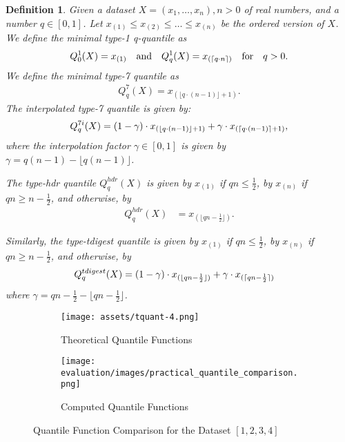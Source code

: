 \documentclass{article}
\DeclarePairedDelimiter{\ceil}{\lceil}{\rceil}
\theoremstyle{plain}
\newtheorem{definition}{Definition}[section]
\theoremstyle{remark}
\newcommand{\qtext}[1]{\quad\text{#1}\quad} %
\newcommand{\floor}[1]{\lfloor#1\rfloor}
\begin{document}
\begin{definition} \label{def:quantiles}
  Given a dataset $X=(x_1,\dots,x_n), n>0$ of real numbers, and a number $q \in [0,1]$.
  Let $x_{(1)} \leq x_{(2)} \leq \dots \leq x_{(n)}$ be the ordered version of $X$.
  We define the minimal type-1 q-quantile as
  \begin{align*}
    Q^1_0(X) = x_{(1)} \qtext{and}  Q^1_q(X) = x_{(\ceil{q \cdot n})} \qtext{for} q > 0.
  \end{align*}
  We define the minimal type-7 quantile as
  \begin{align*}
    Q^{7}_q(X) = x_{(\floor{q \cdot (n - 1)} + 1)}.
  \end{align*}
  The interpolated type-7 quantile is given by:
  \begin{align*}
    Q^{7i}_q(X) = (1 - \gamma) \cdot x_{(\floor{q \cdot (n - 1)} + 1)} + \gamma \cdot x_{(\ceil{q \cdot (n - 1)} + 1)},
  \end{align*}
  where the interpolation factor $\gamma \in [0,1]$ is given by $\gamma = q(n-1) - \floor{q(n-1)}$.

  The type-hdr quantile $Q^{hdr}_q(X)$ is given by $x_{(1)}$ if $qn \leq \frac{1}{2}$, by $x_{(n)}$
  if $qn \geq n - \frac{1}{2}$, and otherwise, by
  \begin{align*}
    Q^{hdr}_q(X) &= x_{(\floor{q n - \frac{1}{2}})}.
  \end{align*}

  Similarly, the type-tdigest quantile is given by $x_{(1)}$ if $qn \leq \frac{1}{2}$, by $x_{(n)}$
  if $qn \geq n - \frac{1}{2}$, and otherwise, by
  \begin{align*}
    Q^{tdigest}_q(X) &= (1 - \gamma) \cdot x_{(\floor{q n - \frac{1}{2}})} + \gamma \cdot x_{(\ceil{q n - \frac{1}{2}})}
  \end{align*}
  where $\gamma = q n - \frac{1}{2} - \floor{q n - \frac{1}{2}}$.
\end{definition}

\begin{figure}
  \begin{subfigure}{0.5\textwidth}
    \texttt{[image: assets/tquant-4.png]}
    \caption{Theoretical Quantile Functions}
    \label{fig:tqf}
  \end{subfigure}
  \begin{subfigure}{0.5 \textwidth}
    \texttt{[image: evaluation/images/practical\_quantile\_comparison.png]}
    \caption{Computed Quantile Functions}
    \label{fig:pqf}
  \end{subfigure}
  \caption{Quantile Function Comparison for the Dataset $[1,2,3,4]$}
  \label{fig:qf}
\end{figure}
\end{document}
